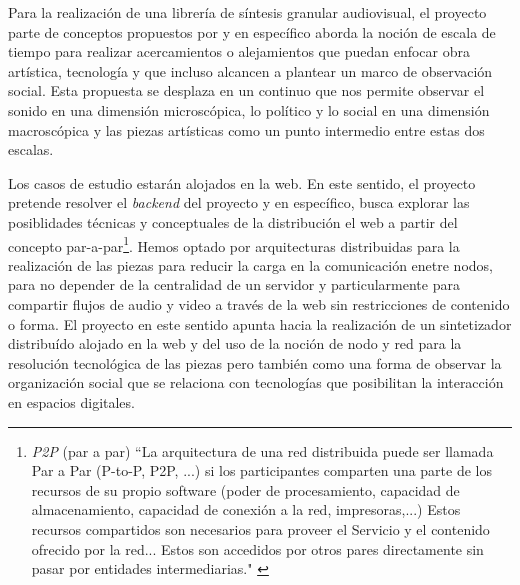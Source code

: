 
Para la realización de una librería de síntesis granular audiovisual, el proyecto parte de conceptos propuestos por \cite{microsound} y en específico aborda la noción de escala de tiempo para realizar acercamientos o alejamientos que puedan enfocar obra artística, tecnología y que incluso alcancen a plantear un marco de observación social. Esta propuesta se desplaza en un continuo que nos permite observar el sonido en una dimensión microscópica, lo político y lo social en una dimensión macroscópica y las piezas artísticas como un punto intermedio entre estas dos escalas. 

Los casos de estudio estarán alojados en la web. En este sentido, el proyecto pretende resolver el \textit{backend} del proyecto y en específico, busca explorar las posiblidades técnicas y conceptuales de la distribución el web a partir del concepto par-a-par\footnote{\textit{P2P} (par a par) ``La arquitectura de una red distribuida puede ser llamada Par a Par (P-to-P, P2P, ...)   si los participantes comparten una parte de los recursos de su propio software (poder de procesamiento, capacidad de almacenamiento, capacidad de conexión a la red, impresoras,...) Estos recursos compartidos son necesarios para proveer el Servicio y el contenido ofrecido por la red... Estos son accedidos por otros pares directamente sin pasar por entidades intermediarias." \citep{p2p}}. Hemos optado por arquitecturas distribuidas para la realización de las piezas para reducir la carga en la comunicación enetre nodos, para no depender de la centralidad de un servidor y particularmente para compartir flujos de audio y video a través de la web sin restricciones de contenido o forma. El proyecto en este sentido apunta hacia la realización de un sintetizador distribuído alojado en la web y del uso de la noción de nodo y red para la resolución tecnológica de las piezas pero también como una forma de observar la organización social que se relaciona con tecnologías que posibilitan la interacción en espacios digitales. 

